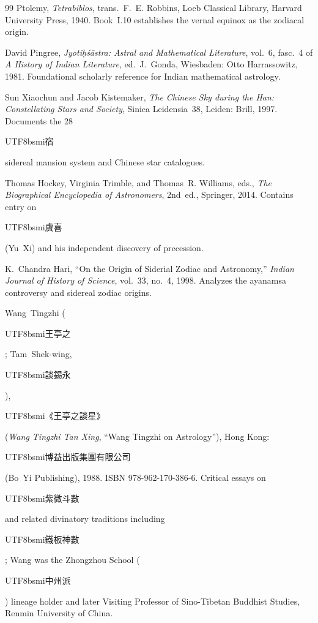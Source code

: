 \documentclass[10pt,a4paper]{article}
\newcommand{\zh}[1]{\begin{CJK}{UTF8}{bsmi}#1\end{CJK}}
\begin{document}
\begin{sloppypar}
\begin{thebibliography}{99}
Ptolemy, \textit{Tetrabiblos}, trans.\ F.~E. Robbins,
Loeb Classical Library, Harvard University Press, 1940.
Book~I.10 establishes the vernal equinox as the zodiacal origin.

David Pingree, \textit{Jyoti\d{h}\'{s}\={a}stra: Astral and
Mathematical Literature}, vol.~6, fasc.~4 of \textit{A History of
Indian Literature}, ed.\ J.~Gonda, Wiesbaden: Otto Harrassowitz,
1981. Foundational scholarly reference for Indian mathematical
astrology.

Sun Xiaochun and Jacob Kistemaker, \textit{The Chinese Sky during
the Han: Constellating Stars and Society}, Sinica Leidensia~38,
Leiden: Brill, 1997. Documents the 28~\zh{宿} sidereal mansion
system and Chinese star catalogues.

Thomas Hockey, Virginia Trimble, and Thomas~R. Williams, eds.,
\textit{The Biographical Encyclopedia of Astronomers}, 2nd~ed.,
Springer, 2014. Contains entry on \zh{虞喜} (Yu~Xi) and his
independent discovery of precession.

K.~Chandra Hari, ``On the Origin of Siderial Zodiac and Astronomy,''
\textit{Indian Journal of History of Science}, vol.~33, no.~4, 1998.
Analyzes the ayanamsa controversy and sidereal zodiac origins.

Wang~Tingzhi (\zh{王亭之}; Tam~Shek-wing, \zh{談錫永}),
\zh{《王亭之談星》} (\textit{Wang Tingzhi Tan Xing}, ``Wang Tingzhi
on Astrology''), Hong Kong: \zh{博益出版集團有限公司} (Bo~Yi
Publishing), 1988.  ISBN 978-962-170-386-6.  Critical essays on
\zh{紫微斗數} and related
divinatory traditions including \zh{鐵板神數}; Wang was the Zhongzhou
School (\zh{中州派}) lineage holder and later Visiting Professor of
Sino-Tibetan Buddhist Studies, Renmin University of China.

\end{thebibliography}
\end{sloppypar}
\end{document}
